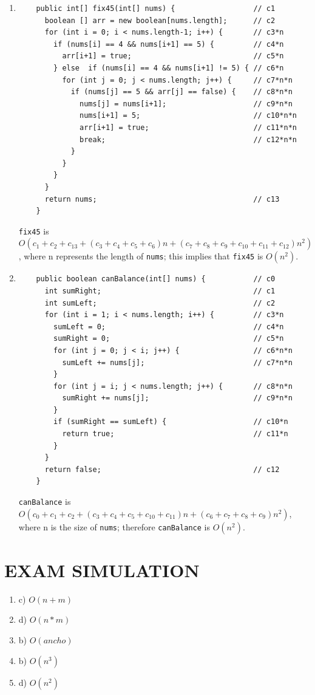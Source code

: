 \documentclass[a4paper,12pt]{article}
\begin{document}
\begin{enumerate}
    \item \begin{Verbatim}
    public int[] fix45(int[] nums) {                  // c1
      boolean [] arr = new boolean[nums.length];      // c2
      for (int i = 0; i < nums.length-1; i++) {       // c3*n
        if (nums[i] == 4 && nums[i+1] == 5) {         // c4*n
          arr[i+1] = true;                            // c5*n
        } else  if (nums[i] == 4 && nums[i+1] != 5) { // c6*n
          for (int j = 0; j < nums.length; j++) {     // c7*n*n
            if (nums[j] == 5 && arr[j] == false) {    // c8*n*n
              nums[j] = nums[i+1];                    // c9*n*n
              nums[i+1] = 5;                          // c10*n*n
              arr[i+1] = true;                        // c11*n*n
              break;                                  // c12*n*n
            }
          }
        }
      }
      return nums;                                    // c13
    }
    \end{Verbatim}
    \texttt{fix45} is $O(c_1+c_2+c_13+(c_3+c_4+c_5+c_6)n+(c_7+c_8+c_9+c_10+c_11+c_12)n^2)$, where n represents the length of \texttt{nums};
    this implies that \texttt{fix45} is $O(n^2)$.
    \item \begin{Verbatim}
    public boolean canBalance(int[] nums) {           // c0
      int sumRight;                                   // c1
      int sumLeft;                                    // c2
      for (int i = 1; i < nums.length; i++) {         // c3*n
        sumLeft = 0;                                  // c4*n
        sumRight = 0;                                 // c5*n
        for (int j = 0; j < i; j++) {                 // c6*n*n
          sumLeft += nums[j];                         // c7*n*n
        }
        for (int j = i; j < nums.length; j++) {       // c8*n*n
          sumRight += nums[j];                        // c9*n*n
        }
        if (sumRight == sumLeft) {                    // c10*n
          return true;                                // c11*n
        }
      }
      return false;                                   // c12
    }
    \end{Verbatim}
    \texttt{canBalance} is $O(c_0+c_1+c_2+(c_3+c_4+c_5+c_10+c_11)n+(c_6+c_7+c_8+c_9)n^2)$, where n is the size of \texttt{nums};
    therefore \texttt{canBalance} is $O(n^2)$.
  \end{enumerate}



  \section{EXAM SIMULATION}
  \begin{enumerate}
    \item c) $O(n+m)$
    \item d) $O(n*m)$
    \item b) $O(ancho)$
    \item b) $O(n^3)$
    \item d) $O(n^2)$
  \end{enumerate}


    \newpage
    
    
\end{document}
